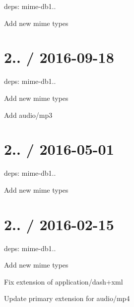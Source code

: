 
\begin{DoxyItemize}
\item deps\+: mime-\/db1..
\begin{DoxyItemize}
\item Add new mime types
\end{DoxyItemize}
\end{DoxyItemize}

\section*{2.. / 2016-\/09-\/18 }


\begin{DoxyItemize}
\item deps\+: mime-\/db1..
\begin{DoxyItemize}
\item Add new mime types
\item Add {\ttfamily audio/mp3}
\end{DoxyItemize}
\end{DoxyItemize}

\section*{2.. / 2016-\/05-\/01 }


\begin{DoxyItemize}
\item deps\+: mime-\/db1..
\begin{DoxyItemize}
\item Add new mime types
\end{DoxyItemize}
\end{DoxyItemize}

\section*{2.. / 2016-\/02-\/15 }


\begin{DoxyItemize}
\item deps\+: mime-\/db1..
\begin{DoxyItemize}
\item Add new mime types
\item Fix extension of {\ttfamily application/dash+xml}
\item Update primary extension for {\ttfamily audio/mp4}
\end{DoxyItemize}
\end{DoxyItemize}

